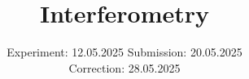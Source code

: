 

\subject{V64}
\title{Interferometry}
\date{%
  Experiment: 12.05.2025
  \hspace{3em}
  Submission: 20.05.2025
  \\
  Correction: 28.05.2025
}



\maketitle
\thispagestyle{empty}
\tableofcontents
\newpage






\printbibliography{}
\appendix
\setcounter{secnumdepth}{0}

